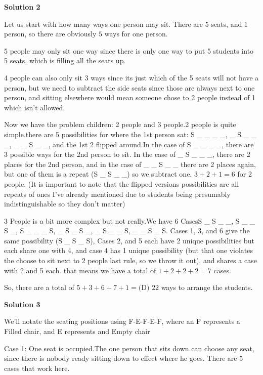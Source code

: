 \begin{enumerate}
 



\textbf{Solution 2}

Let us start with how many ways one person may sit. There are 5 seats, and 1 person, so there are obviously $5$ ways for one person. 

 5 people may only sit one way since there is only one way to put 5 students into 5 seats, which is filling all the seats up.

 4 people can also only sit 3 ways since its just which of the 5 seats will not have a person, but we need to subtract the side seats since those are always next to one person, and sitting elsewhere would mean someone chose to 2 people instead of 1 which isn't allowed.

 Now we have the problem children: 2 people and 3 people.2 people is quite simple.there are 5 possibilities for where the 1st person sat: S \_ \_ \_ \_, \_ S \_ \_ \_, \_ \_ S \_ \_, and the 1st 2 flipped around.In the case of S \_ \_ \_ \_, there are 3 possible ways for the 2nd person to sit. In the case of \_ S \_ \_ \_, there are 2 places for the 2nd person, and in the case of \_ \_ S \_ \_ there are 2 places again, but one of them is a repeat (S \_ S \_ \_) so we subtract one. $3+2+1=6$ for 2 people. (It is important to note that the flipped versions possibilities are all repeats of ones I've already mentioned due to students being presumably indistinguishable so they don't matter)

 3 People is a bit more complex but not really.We have 6 CasesS \_ S \_ \_, S \_ \_ S \_, S \_ \_ \_ S, \_ S \_ S \_, \_ S \_ \_ S, \_ \_ S \_ S. Cases 1, 3, and 6 give the same possibility (S \_ S \_ S), Cases 2, and 5 each have 2 unique possibilities but each share one with 4, and case 4 has 1 unique possibility (but that one violates the choose to sit next to 2 people last rule, so we throw it out), and shares a case with 2 and 5 each. that means we have a total of $1+2+2+2=7$ cases.

 So, there are a total of $5+3+6+7+1=\boxed{\text{(D) }{22}}$ ways to arrange the students.

 



\textbf{Solution 3}

We'll notate the seating positions using F-E-F-E-F, where an F represents a Filled chair, and E represents and Empty chair

 
Case 1: One seat is occupied.The one person that sits down can choose any seat, since there is nobody ready sitting down to effect where he goes.  There are $\boxed{5}$ cases that work here.


\end{enumerate}
